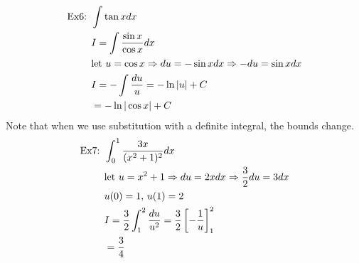 \documentclass[11pt, fleqn]{article}
\begin{document}
\begin{align*}
    \text{Ex6: }&\int\tan xdx\\
    &I=\int\frac{\sin x}{\cos x}dx\\
    &\text{let }u=\cos x\Rightarrow du=-\sin xdx\Rightarrow -du=\sin xdx\\
    &I=-\int\frac{du}{u}=-\ln|u|+C\\
    &=-\ln|\cos x|+C
\end{align*}
Note that when we use substitution with a definite integral, the bounds change.
\begin{align*}
    \text{Ex7: }&\int_0^1\frac{3x}{(x^2+1)^2}dx\\
    &\text{let }u=x^2+1\Rightarrow du=2xdx\Rightarrow \frac{3}{2}du=3dx\\
    &u(0)=1,\,u(1)=2\\
    &I=\frac{3}{2}\int_1^2\frac{du}{u^2}=\frac{3}{2}\left[ -\frac{1}{u} \right]^2_1\\
    &=\frac{3}{4}
\end{align*}
\end{document}
